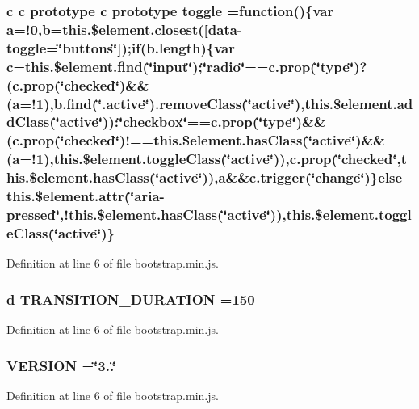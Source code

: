 \subsubsection[{toggle}]{ {\bf c} {\bf c} prototype {\bf c} prototype toggle =function()\{var {\bf a}=!0,{\bf b}=this.\$element.\+closest(\textquotesingle{}\mbox{[}data-\/toggle=\char`\"{}buttons\char`\"{}\mbox{]}\textquotesingle{});if(b.\+length)\{var {\bf c}=this.\$element.\+find(\char`\"{}input\char`\"{});\char`\"{}radio\char`\"{}==c.\+prop(\char`\"{}type\char`\"{})?(c.\+prop(\char`\"{}checked\char`\"{})\&\&(a=!1),b.\+find(\char`\"{}.active\char`\"{}).remove\+Class(\char`\"{}active\char`\"{}),this.\$element.\+add\+Class(\char`\"{}active\char`\"{}))\+:\char`\"{}checkbox\char`\"{}==c.\+prop(\char`\"{}type\char`\"{})\&\&(c.\+prop(\char`\"{}checked\char`\"{})!==this.\$element.\+has\+Class(\char`\"{}active\char`\"{})\&\&(a=!1),this.\$element.\+toggle\+Class(\char`\"{}active\char`\"{})),c.\+prop(\char`\"{}checked\char`\"{},this.\$element.\+has\+Class(\char`\"{}active\char`\"{})),a\&\&c.\+trigger(\char`\"{}change\char`\"{})\}else this.\$element.\+attr(\char`\"{}aria-\/pressed\char`\"{},!this.\$element.\+has\+Class(\char`\"{}active\char`\"{})),this.\$element.\+toggle\+Class(\char`\"{}active\char`\"{})\}}\label{a00029_aa8e797a9bda5e7e313be3518054164a3}


Definition at line 6 of file bootstrap.\+min.\+js.

\hypertarget{a00029_ae4adb159aeacba734c34bd530baf92f6}{}
\subsubsection[{T\+R\+A\+N\+S\+I\+T\+I\+O\+N\+\_\+\+D\+U\+R\+A\+T\+I\+O\+N}]{ {\bf d} T\+R\+A\+N\+S\+I\+T\+I\+O\+N\+\_\+\+D\+U\+R\+A\+T\+I\+O\+N =150}\label{a00029_ae4adb159aeacba734c34bd530baf92f6}


Definition at line 6 of file bootstrap.\+min.\+js.

\hypertarget{a00029_a3635f2df5844f69204b70bf7b3983587}{}
\subsubsection[{V\+E\+R\+S\+I\+O\+N}]{ V\+E\+R\+S\+I\+O\+N =\char`\"{}3..\char`\"{}}\label{a00029_a3635f2df5844f69204b70bf7b3983587}


Definition at line 6 of file bootstrap.\+min.\+js.

